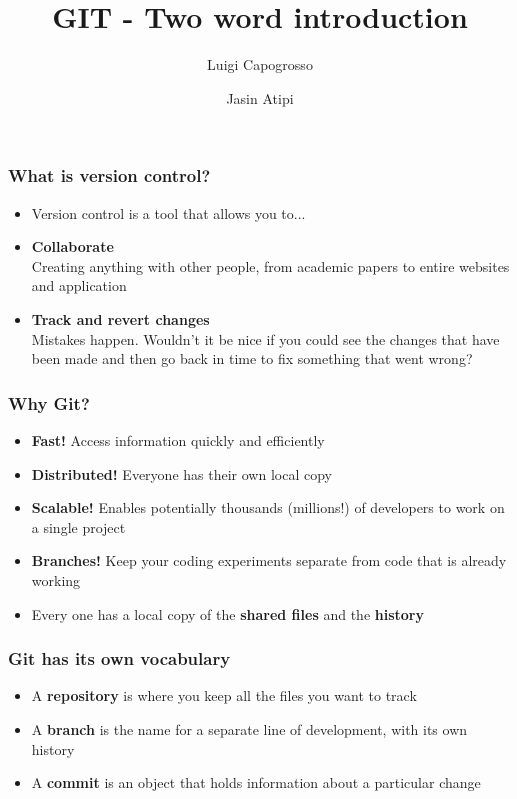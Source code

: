 \documentclass{beamer}
\title{GIT - Two word introduction}
\author{Luigi Capogrosso \and Jasin Atipi}
\begin{document}
\begin{frame}
\maketitle
\end{frame}

\begin{frame}
\frametitle{What is version control?}
\begin{itemize}
\item <1-> Version control is a tool that allows you to...
\item <2-> \textbf{Collaborate} \\ 
Creating anything with other people, from academic papers to entire websites and application
\item <3-> \textbf{Track and revert changes} \\ 
Mistakes happen. Wouldn't it be nice if you could see the changes that have been made and then go back in time to fix something that went wrong?
\end{itemize}
\end{frame}

\begin{frame}
\frametitle{Why Git?}
\begin{itemize}
\item<1-> \textbf{Fast!} Access information quickly and efficiently
\item<2-> \textbf{Distributed!} Everyone has their own local copy
\item<3-> \textbf{Scalable!} Enables potentially thousands (millions!) of developers to work on a single project
\item<4-> \textbf{Branches!} Keep your coding experiments separate from code that is already working
\item<5-> Every one has a local copy of the \textbf{shared files} and the \textbf{history}
\end{itemize}
\end{frame}

\begin{frame}
\frametitle{Git has its own vocabulary}
\begin{itemize}
\item <1-> A \textbf{repository} is where you keep all the files you want to track
\item <2-> A \textbf{branch} is the name for a separate line of development, with its own history
\item <3-> A \textbf{commit} is an object that holds information about a particular change
\end{itemize}
\end{frame}
\end{document}
